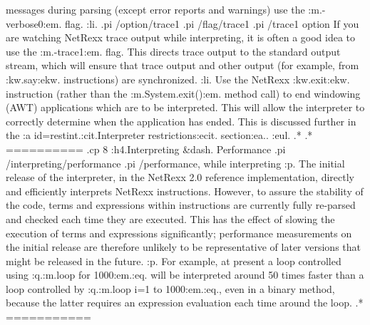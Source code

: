 messages during parsing (except error reports and warnings) use
the :m.-verbose0:em. flag.
:li.
.pi /option/trace1
.pi /flag/trace1
.pi /trace1 option
If you are watching NetRexx trace output while interpreting, it is often
a good idea to use the :m.-trace1:em. flag.  This directs trace output
to the standard output stream, which will ensure that trace output and
other output (for example, from :kw.say:ekw. instructions) are
synchronized.
:li.
Use the NetRexx :kw.exit:ekw. instruction (rather than the :m.System.exit():em.
method call) to end windowing (AWT) applications which are to be
interpreted.  This will allow the interpreter to correctly determine
when the application has ended.  This is discussed further in the
:a id=restint.:cit.Interpreter restrictions:ecit. section:ea..
:eul.
.*
.* ==========
.cp 8
:h4.Interpreting &dash. Performance
.pi /interpreting/performance
.pi /performance, while interpreting
:p.
The initial release of the interpreter, in the NetRexx 2.0 reference
implementation, directly and efficiently interprets NetRexx
instructions.  However, to assure the stability of the code, terms and
expressions within instructions are currently fully re-parsed and
checked each time they are executed.  This has the effect of slowing the
execution of terms and expressions significantly; performance
measurements on the initial release are therefore unlikely to be
representative of later versions that might be released in the future.
:p.
For example, at present a loop controlled using :q.:m.loop for
1000:em.:eq. will be interpreted around 50 times faster than a loop
controlled by :q.:m.loop i=1 to 1000:em.:eq., even in a binary method,
because the latter requires an expression evaluation each time around
the loop.
.* ===========
